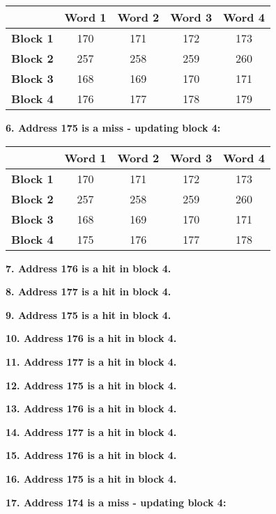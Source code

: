 \documentclass[a4paper, 11pt]{exam}
\begin{document}
\begin{enumerate}
\begin{center}
	\begin{tabular}{ |c|c|c|c|c| } 
		\hline
		&\textbf{Word 1}& \textbf{Word 2}& \textbf{Word 3} & \textbf{Word 4}\\ 
		\hline
		\textbf{Block 1} & 170 & 171  & 172 & 173\\ 
		\hline
		\textbf{Block 2} & 257 & 258  & 259 & 260\\ 
		\hline
		\textbf{Block 3} & 168 &  169 & 170 & 171\\ 
		\hline
		\textbf{Block 4} & 176 & 177  & 178 & 179\\ 
		\hline
	\end{tabular}
\end{center}

\textbf{6. Address 175 is a miss - updating block 4:}

\begin{center}
	\begin{tabular}{ |c|c|c|c|c| } 
		\hline
		&\textbf{Word 1}& \textbf{Word 2}& \textbf{Word 3} & \textbf{Word 4}\\ 
		\hline
		\textbf{Block 1} & 170 & 171  & 172 & 173\\ 
		\hline
		\textbf{Block 2} & 257 & 258  & 259 & 260\\ 
		\hline
		\textbf{Block 3} & 168 &  169 & 170 & 171\\ 
		\hline
		\textbf{Block 4} & 175 & 176  & 177 & 178\\ 
		\hline
	\end{tabular}
\end{center}

\textbf{7. Address 176 is a hit in block 4.}

\textbf{8. Address 177 is a hit in block 4.}

\textbf{9. Address 175 is a hit in block 4.}

\textbf{10. Address 176 is a hit in block 4.}

\textbf{11. Address 177 is a hit in block 4.}

\textbf{12. Address 175 is a hit in block 4.}

\textbf{13. Address 176 is a hit in block 4.}

\textbf{14. Address 177 is a hit in block 4.}

\textbf{15. Address 176 is a hit in block 4.}

\textbf{16. Address 175 is a hit in block 4.}

\textbf{17. Address 174 is a miss - updating block 4:}


\end{enumerate}
\end{document}
